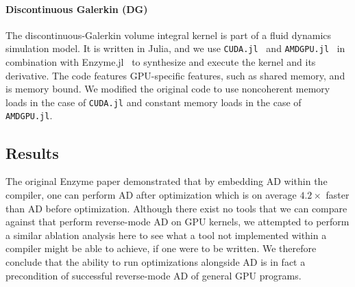 \begin{figure*}
    \centering
    
    \caption{}
    \label{fig:effect_of_optimisations}
\end{figure*}

\paragraph{\textbf{Discontinuous Galerkin (DG)}}
The  discontinuous-\-Galerkin  volume integral\cite{dg_wilcox} kernel is part of a fluid dynamics simulation model. It is written in Julia, and we use \texttt{CUDA.jl}~\cite{besard2018juliagpu} and \texttt{AMDGPU.jl}~\cite{AMDGPU2021} in combination with Enzyme.jl~\cite{enzymeNeurips} to synthesize and execute the kernel and its derivative. The code features GPU-specific features, such as shared memory, and is memory bound. We modified the original code to use noncoherent memory loads in the case of \texttt{CUDA.jl} and constant memory loads in the case of \texttt{AMDGPU.jl}.

\subsection{Results}

The original Enzyme paper \cite{enzymeNeurips} demonstrated that by embedding AD within the compiler, one can perform AD after optimization which is on average $4.2\times$ faster than AD before optimization.
Although there exist no tools that we can compare against that perform reverse-mode AD on GPU kernels, we attempted to perform a similar ablation analysis here to see what a tool not implemented within a compiler might be able to achieve, if one were to be written. 
We therefore conclude that the ability to run optimizations alongside AD is in fact a precondition of successful reverse-mode AD of general GPU programs.

